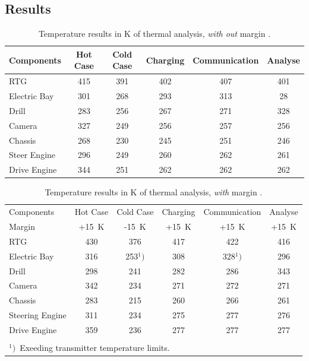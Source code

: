 \subsection{Results}
\begin{table}[htb]
	\centering
	\caption{Temperature results in K of thermal analysis, \textit{with out}  margin .}
	\begin{tabular}{lccccc}
		\toprule
		Components & Hot Case & Cold Case & Charging & Communication & Analyse  \\ \midrule
		RTG  & 415 & 391 & 402 & 407  &  401   \\
		Electric Bay & 301 & 268 & 293 & 313 & 28 \\
		Drill  & 283 & 256 & 267 & 271 & 328  \\
		Camera & 327 & 249 & 256 & 257 & 256 \\
		Chassis & 268 & 230  & 245 & 251 & 246 \\
		Steer Engine & 296 & 249 & 260 & 262 & 261  \\
		Drive Engine & 344 & 251 & 262 & 262 & 262 \\   \bottomrule
	\end{tabular}
	\label{tab:tcs_temp1}
\end{table}

\begin{table}[htb]
	\centering
	\caption{Temperature results in K of thermal analysis, \textit{with}  margin .}
	\begin{tabular}{lccccc}
		\hline
		Components & Hot Case & Cold Case & Charging & Communication & Analyse  \\[0.25em]
		Margin & +15~K & -15~K & +15~K & +15~K & +15~K \\ \hline
		RTG  & 430 & 376 & 417 & 422  & 416    \\
		Electric Bay & 316 & \cellcolor[HTML]{FFCE93} 253$^1)$ & 308 &\cellcolor[HTML]{FFCE93} 328$^1)$ & 296 \\
		Drill  & 298 & 241 & 282 & 286 & 343  \\
		Camera & 342 & 234 & 271 & 272 & 271 \\
		Chassis & 283 & 215 & 260 & 266 & 261 \\
		Steering Engine & 311 & 234 & 275 & 277 & 276  \\
		Drive Engine & 359 & 236 & 277 & 277 & 277 \\   \hline
		& & & & & \\[-0.5em]
		\multicolumn{6}{l}{$^1)$\ Exeeding transmitter temperature limits.}
	\end{tabular}
	\label{tab:tcs_temp2}
\end{table}



